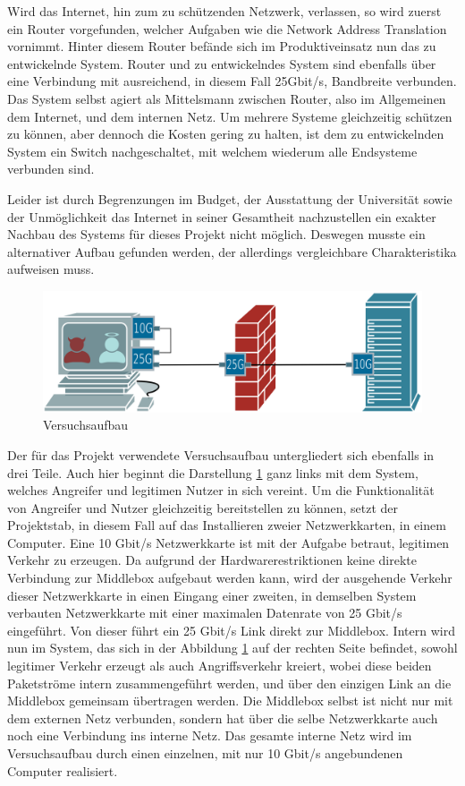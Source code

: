 \documentclass[../review_3.tex]{subfiles}
\begin{document}
Wird das Internet, hin zum zu schützenden Netzwerk, verlassen, so wird zuerst ein Router vorgefunden, welcher Aufgaben wie die Network Address Translation vornimmt. Hinter diesem Router befände sich im Produktiveinsatz nun das zu entwickelnde System. Router und zu entwickelndes System sind ebenfalls über eine Verbindung mit ausreichend, in diesem Fall 25Gbit/s, Bandbreite verbunden. Das System selbst agiert als Mittelsmann zwischen Router, also im Allgemeinen dem Internet, und dem internen Netz. Um mehrere Systeme gleichzeitig schützen zu können, aber dennoch die Kosten gering zu halten, ist dem zu entwickelnden System ein Switch nachgeschaltet, mit welchem wiederum alle Endsysteme verbunden sind.

Leider ist durch Begrenzungen im Budget, der Ausstattung der Universität sowie der Unmöglichkeit das Internet in seiner Gesamtheit nachzustellen ein exakter Nachbau des Systems für dieses Projekt nicht möglich. Deswegen musste ein alternativer Aufbau gefunden werden, der allerdings vergleichbare Charakteristika aufweisen muss.

\begin{figure}[h]
    \centering
    \includegraphics[width=0.7\linewidth]{img/Netwerkplan-Versuch.png}
    \caption{Versuchsaufbau}
    \label{fig:Versuchsaufbau}
\end{figure}

Der für das Projekt verwendete Versuchsaufbau untergliedert sich ebenfalls in drei Teile. Auch hier beginnt die Darstellung \ref{fig:Versuchsaufbau} ganz links mit dem System, welches Angreifer und legitimen Nutzer in sich vereint. Um die Funktionalität von Angreifer und Nutzer gleichzeitig bereitstellen zu können, setzt der Projektstab, in diesem Fall auf das Installieren zweier Netzwerkkarten, in einem Computer. Eine 10 Gbit/s Netzwerkkarte ist mit der Aufgabe betraut, legitimen Verkehr zu erzeugen. Da aufgrund der Hardwarerestriktionen keine direkte Verbindung zur Middlebox aufgebaut werden kann, wird der ausgehende Verkehr dieser Netzwerkkarte in einen Eingang einer zweiten, in demselben System verbauten Netzwerkkarte mit einer maximalen Datenrate von 25 Gbit/s eingeführt. Von dieser führt ein 25 Gbit/s Link direkt zur Middlebox. Intern wird nun im System, das sich in der Abbildung \ref{fig:Versuchsaufbau} auf der rechten Seite befindet, sowohl legitimer Verkehr erzeugt als auch Angriffsverkehr kreiert, wobei diese beiden Paketströme intern zusammengeführt werden, und über den einzigen Link an die Middlebox gemeinsam übertragen werden. Die Middlebox selbst ist nicht nur mit dem externen Netz verbunden, sondern hat über die selbe Netzwerkkarte auch noch eine Verbindung ins interne Netz. Das gesamte interne Netz wird im Versuchsaufbau durch einen einzelnen, mit nur 10 Gbit/s angebundenen Computer realisiert.
\end{document}
